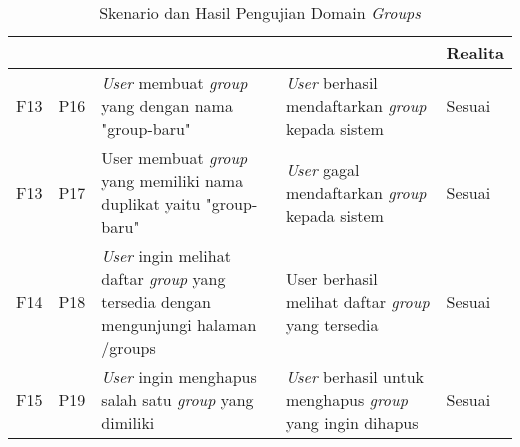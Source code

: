\bgroup
\begin{table}[ht]
  \def\arraystretch{1.3}
  \caption{Skenario dan Hasil Pengujian Domain \textit{Groups}}
  \label{tab:pengujian-domain-groups}
  \centering
  \begin{tabular}{|p{2cm}|p{2cm}|p{3cm}|p{3cm}|p{1.5cm}|}
    \hline
    \centering{ID Fungsional} & \centering{ID Pengujian} & \centering{Skenario}                                                                               & \centering{Ekspektasi}                                                   & Realita \\
    \hline
    F13                       & P16                      & \textit{User} membuat \textit{group} yang dengan nama "group-baru"                                 & \textit{User} berhasil mendaftarkan \textit{group} kepada sistem         & Sesuai  \\
    \hline
    F13                       & P17                      & {User} membuat \textit{group} yang memiliki nama duplikat yaitu "group-baru"                       & \textit{User} gagal mendaftarkan \textit{group} kepada sistem            & Sesuai  \\
    \hline
    F14                       & P18                      & \textit{User} ingin melihat daftar \textit{group} yang tersedia dengan mengunjungi halaman /groups & User berhasil melihat daftar \textit{group} yang tersedia                & Sesuai  \\
    \hline
    F15                       & P19                      & \textit{User} ingin menghapus salah satu \textit{group} yang dimiliki                              & \textit{User} berhasil untuk menghapus \textit{group} yang ingin dihapus & Sesuai  \\
    \hline
  \end{tabular}
\end{table}
\egroup

